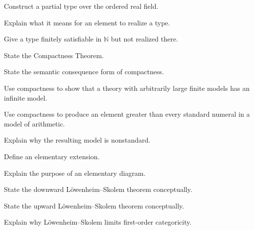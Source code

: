 \begin{exercise}[2]
Construct a partial type over the ordered real field.
\end{exercise}

\begin{exercise}[3]
Explain what it means for an element to realize a type.
\end{exercise}

\begin{exercise}[3]
Give a type finitely satisfiable in \(\mathbb{N}\) but not realized there.
\end{exercise}

\begin{exercise}[2]
State the Compactness Theorem.
\end{exercise}

\begin{exercise}[3]
State the semantic consequence form of compactness.
\end{exercise}

\begin{exercise}[3]
Use compactness to show that a theory with arbitrarily large finite models
has an infinite model.
\end{exercise}

\begin{exercise}[3]
Use compactness to produce an element greater than every standard numeral
in a model of arithmetic.
\end{exercise}

\begin{exercise}[3]
Explain why the resulting model is nonstandard.
\end{exercise}

\begin{exercise}[3]
Define an elementary extension.
\end{exercise}

\begin{exercise}[3]
Explain the purpose of an elementary diagram.
\end{exercise}

\begin{exercise}[2]
State the downward Löwenheim--Skolem theorem conceptually.
\end{exercise}

\begin{exercise}[2]
State the upward Löwenheim--Skolem theorem conceptually.
\end{exercise}

\begin{exercise}[3]
Explain why Löwenheim--Skolem limits first-order categoricity.
\end{exercise}

